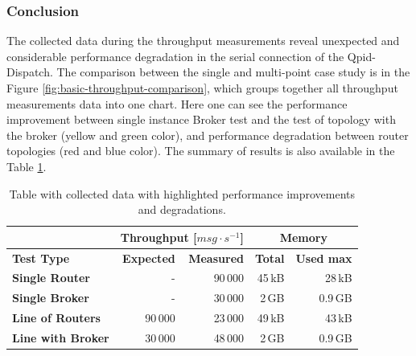 \subsubsection*{Conclusion}
The collected data during the throughput measurements reveal unexpected and considerable performance degradation in the serial connection of the Qpid-Dispatch. The comparison between the single and multi-point case study is in the Figure \ref{fig:basic-throughput-comparison}, which groups together all throughput measurements data into one chart. Here one can see the performance improvement between single instance Broker test and the test of topology with the broker (yellow and green color), and performance degradation between router topologies (red and blue color). The summary of results is also available in the Table \ref{tab:throughput-summary}.

\begingroup
\setlength{\tabcolsep}{10pt} %
\renewcommand{\arraystretch}{1.35} %
	\begin{table}[h]
	\centering
	\caption{Table with collected data with highlighted performance improvements and degradations.}
	\label{tab:throughput-summary}
	\begin{tabular}{|l|r|r|r|r|}
	\hline
	\rowcolor[HTML]{C5E3DF}
	 & \multicolumn{2}{c|}{\textbf{Throughput [$msg \cdot s^{-1}$]}} & \multicolumn{2}{c|}{\textbf{Memory}} \\ \hline
	\rowcolor[HTML]{C5E3DF}
	\textbf{Test Type} & \textbf{Expected} & \textbf{Measured} & \textbf{Total} & \textbf{Used max} \\ \hline
	\textbf{Single Router} & - & 90\,000 & 45\,kB & 28\,kB \\ \hline
	\textbf{Single Broker} & - & 30\,000 & 2\,GB & 0.9\,GB \\ \hline
	\textbf{Line of Routers} & 90\,000 & \cellcolor[HTML]{FFCCC9}23\,000 & 49\,kB & 43\,kB \\ \hline
	\textbf{Line with Broker} & 30\,000 & \cellcolor[HTML]{9AFF99}48\,000 & 2\,GB & 0.9\,GB \\ \hline
	\end{tabular}
	\end{table}
\endgroup

